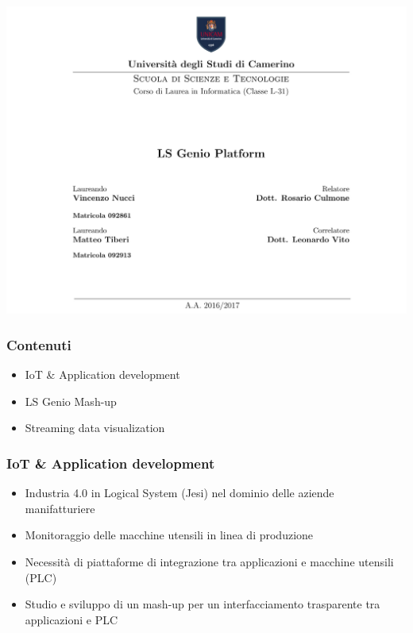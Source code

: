\documentclass{beamer}
\date{}
\begin{document}
	
	\begin{frame}
	\centering
	\includegraphics[scale=0.25]{images/frontespizio-beamer.png}\par
\end{frame}

\begin{frame}
	\frametitle{Contenuti}
	\begin{itemize}
		\item IoT \& Application development
		\item LS Genio Mash-up
		\item Streaming data visualization
	\end{itemize}
\end{frame}

\begin{frame}
	\frametitle{IoT \& Application development}
	\begin{itemize}
		\item Industria 4.0 in Logical System (Jesi) nel dominio delle aziende manifatturiere
		\item Monitoraggio delle macchine utensili in linea di produzione
		\item Necessità di piattaforme di integrazione tra applicazioni e macchine utensili (PLC)
		\item Studio e sviluppo di un mash-up per un interfacciamento trasparente tra applicazioni e PLC
	\end{itemize}
\end{frame}
\end{document}

